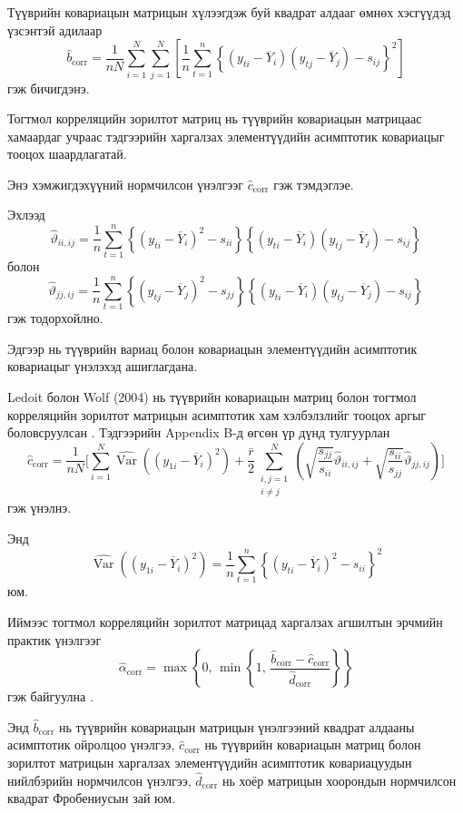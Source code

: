 Түүврийн ковариацын матрицын
хүлээгдэж буй квадрат алдааг өмнөх хэсгүүдэд үзсэнтэй адилаар 
\[
\widehat b_{\mathrm{corr}}
=
\frac{1}{nN}
\sum_{i=1}^{N}\sum_{j=1}^{N}
\left[
\frac{1}{n}
\sum_{t=1}^{n}
\left\{
(y_{ti}-\overline{Y}_i)
(y_{tj}-\overline{Y}_j)-s_{ij}
\right\}^2
\right]
\]
гэж бичигдэнэ.

Тогтмол корреляцийн зорилтот матриц
нь түүврийн ковариацын матрицаас
хамаардаг учраас тэдгээрийн
харгалзах элементүүдийн
асимптотик ковариацыг тооцох
шаардлагатай.

Энэ хэмжигдэхүүний нормчилсон
үнэлгээг $\widehat c_{\mathrm{corr}}$
гэж тэмдэглэе.

Эхлээд
\[
\widehat{\vartheta}_{ii,ij}
=
\frac{1}{n}
\sum_{t=1}^{n}
\left\{
(y_{ti}-\overline{Y}_i)^2-s_{ii}
\right\}
\left\{
(y_{ti}-\overline{Y}_i)
(y_{tj}-\overline{Y}_j)-s_{ij}
\right\}
\]
болон
\[
\widehat{\vartheta}_{jj,ij}
=
\frac{1}{n}
\sum_{t=1}^{n}
\left\{
(y_{tj}-\overline{Y}_j)^2-s_{jj}
\right\}
\left\{
(y_{ti}-\overline{Y}_i)
(y_{tj}-\overline{Y}_j)-s_{ij}
\right\}
\]
гэж тодорхойлно.

Эдгээр нь түүврийн вариац болон
ковариацын элементүүдийн
асимптотик ковариацыг үнэлэхэд
ашиглагдана.

Ledoit болон Wolf (2004) нь түүврийн ковариацын
матриц болон тогтмол корреляцийн зорилтот матрицын
асимптотик хам хэлбэлзлийг тооцох аргыг
боловсруулсан \citep{ledoitwolf2004a}.
Тэдгээрийн Appendix B-д өгсөн үр дүнд тулгуурлан
\[
\widehat c_{\mathrm{corr}}
=
\frac{1}{nN}
\Bigg[
\sum_{i=1}^{N}
\widehat{\operatorname{Var}}
\left((y_{1i}-\overline{Y}_i)^2\right)+
\frac{\bar r}{2}
\sum_{\substack{i,j=1\\i\neq j}}^{N}
\left(
\sqrt{\frac{s_{jj}}{s_{ii}}}
\widehat{\vartheta}_{ii,ij}
+
\sqrt{\frac{s_{ii}}{s_{jj}}}
\widehat{\vartheta}_{jj,ij}
\right)
\Bigg]
\]
гэж үнэлнэ.

Энд
\[
\widehat{\operatorname{Var}}
\left((y_{1i}-\overline{Y}_i)^2\right)
=
\frac{1}{n}
\sum_{t=1}^{n}
\left\{
(y_{ti}-\overline{Y}_i)^2-s_{ii}
\right\}^2
\]
юм.

Иймээс тогтмол корреляцийн
зорилтот матрицад харгалзах
агшилтын эрчмийн практик үнэлгээг
\[
\widehat{\alpha}_{\mathrm{corr}}
=
\max\left\{
0,\,
\min\left\{
1,\,
\frac{
	\widehat b_{\mathrm{corr}}
	-
	\widehat c_{\mathrm{corr}}
}{
	\widehat d_{\mathrm{corr}}
}
\right\}
\right\}
\]
гэж байгуулна \citep{ledoitwolf2004a}.

Энд $\widehat b_{\mathrm{corr}}$ нь
түүврийн ковариацын матрицын
үнэлгээний квадрат алдааны
асимптотик ойролцоо үнэлгээ,
$\widehat c_{\mathrm{corr}}$ нь
түүврийн ковариацын матриц болон
зорилтот матрицын харгалзах
элементүүдийн асимптотик
ковариацуудын нийлбэрийн
нормчилсон үнэлгээ,
$\widehat d_{\mathrm{corr}}$ нь
хоёр матрицын хоорондын
нормчилсон квадрат Фробениусын
зай юм.

